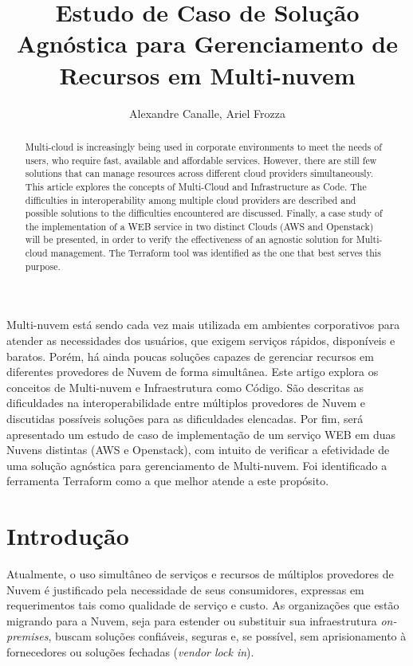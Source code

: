 \documentclass[12pt]{article}
\title{Estudo de Caso de Solução Agnóstica para Gerenciamento de Recursos em Multi-nuvem}
\author{Alexandre Canalle\inst{1}, Ariel Frozza\inst{1}}
\begin{document}
\sloppy
\maketitle
	
\begin{abstract}
	Multi-cloud is increasingly being used in corporate environments to meet the needs of users, who require fast, available and affordable services. However, there are still few solutions that can manage resources across different cloud providers simultaneously. This article explores the concepts of Multi-Cloud and Infrastructure as Code. The difficulties in interoperability among multiple cloud providers are described and possible solutions to the difficulties encountered are discussed. Finally, a case study of the implementation of a WEB service in two distinct Clouds (AWS and Openstack) will be presented, in order to verify the effectiveness of an agnostic solution for Multi-cloud management. The Terraform tool was identified as the one that best serves this purpose.
\end{abstract}

\begin{resumo} 
	Multi-nuvem está sendo cada vez mais utilizada em ambientes corporativos para atender as necessidades dos usuários, que exigem serviços rápidos, disponíveis e baratos. Porém, há ainda poucas soluções capazes de gerenciar recursos em diferentes provedores de Nuvem de forma simultânea. Este artigo explora os conceitos de Multi-nuvem e Infraestrutura como Código. São descritas as dificuldades na interoperabilidade entre múltiplos provedores de Nuvem e discutidas possíveis soluções para as dificuldades elencadas. Por fim, será apresentado um estudo de caso de implementação de um serviço WEB em duas Nuvens distintas (AWS e Openstack), com intuito de verificar a efetividade de uma solução agnóstica para gerenciamento de Multi-nuvem. Foi identificado a ferramenta Terraform como a que melhor atende a este propósito.
\end{resumo}

	\section{Introdução}
	    Atualmente, o uso simultâneo de serviços e recursos de múltiplos provedores de Nuvem é justificado pela necessidade de seus consumidores, expressas em requerimentos tais como qualidade de serviço e custo. As organizações que estão migrando para a Nuvem, seja para estender ou substituir sua infraestrutura \textit{on-premises}, buscam soluções confiáveis, seguras e, se possível, sem aprisionamento à fornecedores ou soluções fechadas (\textit{vendor lock in}).
	    
\end{document}
